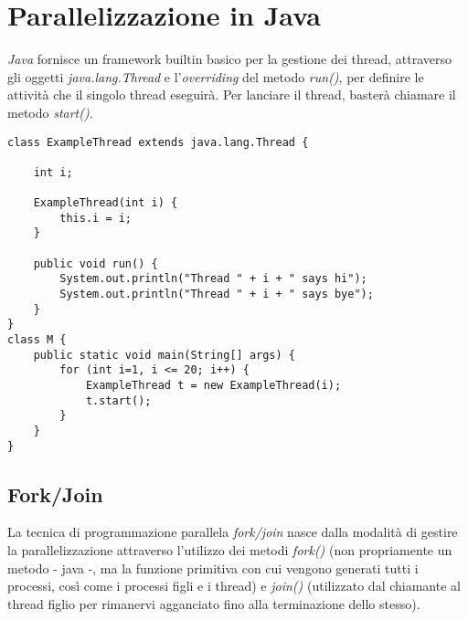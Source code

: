 \section{Parallelizzazione in Java}
\textit{Java} fornisce un framework builtin basico per la gestione dei thread, attraverso gli oggetti \textit{java.lang.Thread} e l'\textit{overriding} del metodo \textit{run()}, per definire le attività che il singolo thread eseguirà. Per lanciare il thread, basterà chiamare il metodo \textit{start()}. \\
\begin{lstlisting}
class ExampleThread extends java.lang.Thread {
	
	int i;
	
	ExampleThread(int i) {
		this.i = i;
	}
	
	public void run() {
		System.out.println("Thread " + i + " says hi");
		System.out.println("Thread " + i + " says bye");
	}
}
class M {
	public static void main(String[] args) {
		for (int i=1, i <= 20; i++) {
			ExampleThread t = new ExampleThread(i);
			t.start();
		}
	}
}
\end{lstlisting}

\subsection{Fork/Join}
La tecnica di programmazione parallela \textit{fork/join} nasce dalla modalità di gestire la parallelizzazione attraverso l'utilizzo dei metodi \textit{fork()} (non propriamente un metodo - java -, ma la funzione primitiva con cui vengono generati tutti i processi, così come i processi figli e i thread) e \textit{join()} (utilizzato dal chiamante al thread figlio per rimanervi agganciato fino alla terminazione dello stesso).

